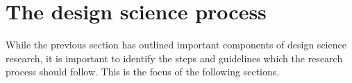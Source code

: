 
\section{The design science process} \label{sec:DesignScienceProcess}
While the previous section has outlined important components of design science research, it is important to identify the steps and guidelines which the research process should follow. This is the focus of the following sections.

